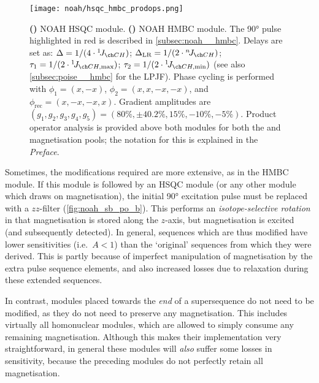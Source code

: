 \begin{figure}[htb]
    \centering
    \texttt{[image: noah/hsqc\_hmbc\_prodops.png]}%
    {\label{fig:noah_sb_po_s}}%
    {\label{fig:noah_sb_po_b}}%
    \caption[NOAH HSQC and HMBC modules with product operator analysis]{
        \textbf{()} 
        NOAH HSQC module.
        \textbf{()} 
        NOAH HMBC module.
        The \ang{90} pulse highlighted in red is described in \cref{subsec:noah__hmbc}.
        Delays are set as: $\Delta = 1 / (4 \cdot \oneJ{CH})$; $\Delta_\text{LR} = 1 / (2 \cdot \nJ{CH})$; $\tau_1 = 1 / (2 \cdot \oneJ{CH,\text{max}})$; $\tau_2 = 1 / (2 \cdot \oneJ{CH,\text{min}})$ (see also \cref{subsec:poise__hmbc} for the LPJF).
        Phase cycling is performed with $\phi_1 = (x, -x)$, $\phi_2 = (x, x, -x, -x)$, and $\phi_\text{rec} = (x, -x, -x, x)$.
        Gradient amplitudes are $(g_1, g_2, g_3, g_4, g_5) = (80\%, \pm 40.2\%, 15\%, -10\%, -5\%)$.
        Product operator analysis is provided above both modules for both the  and  magnetisation pools; the notation for this is explained in the \textit{Preface}.
    }
    \label{fig:noah_sb_po}
\end{figure}

Sometimes, the modifications required are more extensive, as in the HMBC module.
If this module is followed by an HSQC module (or any other module which draws on  magnetisation), the initial \ang{90} excitation pulse must be replaced with a $zz$-filter (\cref{fig:noah_sb_po_b}).
This performs an \textit{isotope-selective rotation} in that  magnetisation is stored along the $z$-axis, but  magnetisation is excited (and subsequently detected).
In general, sequences which are thus modified have lower sensitivities (i.e.\ $A < 1$) than the `original' sequences from which they were derived.
This is partly because of imperfect manipulation of magnetisation by the extra pulse sequence elements, and also increased losses due to relaxation during these extended sequences.

In contrast, modules placed towards the \textit{end} of a supersequence do not need to be modified, as they do not need to preserve any magnetisation.
This includes virtually all homonuclear modules, which are allowed to simply consume any remaining magnetisation.
Although this makes their implementation very straightforward, in general these modules will \textit{also} suffer some losses in sensitivity, because the preceding modules do not perfectly retain all magnetisation.

